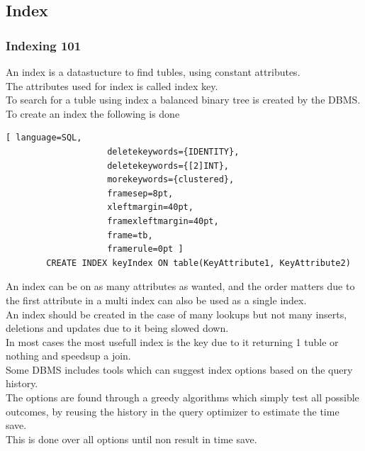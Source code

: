 \documentclass[12pt, a4paper]{article}
\newcommand{\beginSQL}{\begin{lstlisting}[ language=SQL,
                    deletekeywords={IDENTITY},
                    deletekeywords={[2]INT},
                    morekeywords={clustered},
                    framesep=8pt,
                    xleftmargin=40pt,
                    framexleftmargin=40pt,
                    frame=tb,
                    framerule=0pt ]}
\begin{document}
		\subsection{Index}
			\subsubsection{Indexing 101}
				An index is a datastucture to find tubles, using constant attributes.\\
				The attributes used for index is called index key.\\
				To search for a tuble using index a balanced binary tree is created by the DBMS.\\
				To create an index the following is done
				\beginSQL
		CREATE INDEX keyIndex ON table(KeyAttribute1, KeyAttribute2)
				\end{lstlisting}
				An index can be on as many attributes as wanted, and the order matters due to the first attribute in a multi index can also be used as a single index.\\
				An index should be created in the case of many lookups but not many inserts, deletions and updates due to it being slowed down.\\
				In most cases the most usefull index is the key due to it returning 1 tuble or nothing and speedsup a join.\\
				Some DBMS includes tools which can suggest index options based on the query history.\\
				The options are found through a greedy algorithms which simply test all possible outcomes, by reusing the history in the query optimizer to estimate the time save.\\
				This is done over all options until non result in time save.
\end{document}
